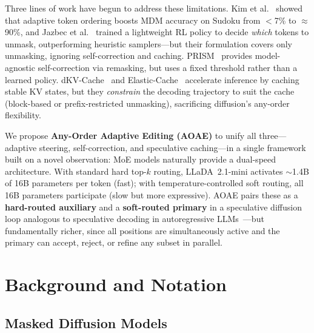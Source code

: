 \documentclass[11pt]{article}
\begin{document}
Three lines of work have begun to address these limitations. Kim et al.~\cite{kim2025trainworst} showed that adaptive token ordering boosts MDM accuracy on Sudoku from $<$7\% to ${\approx}$90\%, and Jazbec et al.~\cite{jazbec2025learning} trained a lightweight RL policy to decide \emph{which} tokens to unmask, outperforming heuristic samplers---but their formulation covers only unmasking, ignoring self-correction and caching.
PRISM~\cite{kim2025prism} provides model-agnostic self-correction via remasking, but uses a fixed threshold rather than a learned policy.
dKV-Cache~\cite{ma2025dkv} and Elastic-Cache~\cite{elastic_cache} accelerate inference by caching stable KV states, but they \emph{constrain} the decoding trajectory to suit the cache (block-based or prefix-restricted unmasking), sacrificing diffusion's any-order flexibility.

We propose \textbf{Any-Order Adaptive Editing (AOAE)} to unify all three---adaptive steering, self-correction, and speculative caching---in a single framework built on a novel observation: MoE models naturally provide a dual-speed architecture.
With standard hard top-$k$ routing, LLaDA~2.1-mini activates ${\sim}$1.4B of 16B parameters per token (fast); with temperature-controlled soft routing, all 16B parameters participate (slow but more expressive).
AOAE pairs these as a \textbf{hard-routed auxiliary} and a \textbf{soft-routed primary} in a speculative diffusion loop analogous to speculative decoding in autoregressive LLMs~\cite{leviathan2023fast,chen2023accelerating}---but fundamentally richer, since all positions are simultaneously active and the primary can accept, reject, or refine any subset in parallel.

\section{Background and Notation}
\label{sec:background}

\subsection{Masked Diffusion Models}
\label{sec:bg_mdm}
\end{document}
